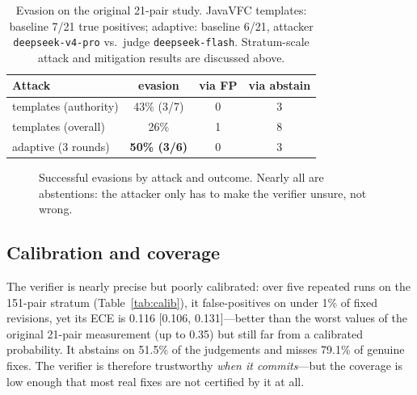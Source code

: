 \documentclass[conference]{IEEEtran}
\newcommand{\code}[1]{\texttt{#1}}
\begin{document}
\begin{table}[t]
\centering
\caption{Evasion on the original 21-pair study. JavaVFC templates: baseline 7/21
true positives; adaptive: baseline 6/21, attacker \code{deepseek-v4-pro} vs.\
judge \code{deepseek-flash}. Stratum-scale attack and mitigation results are
discussed above.}
\label{tab:evasion}
\small
\begin{tabular}{@{}lccc@{}}
\toprule
Attack & evasion & via FP & via abstain \\
\midrule
templates (authority) & 43\% (3/7) & 0 & 3 \\
templates (overall) & 26\% & 1 & 8 \\
adaptive (3 rounds) & \textbf{50\% (3/6)} & 0 & 3 \\
\bottomrule
\end{tabular}
\end{table}

\begin{figure}[t]
\centering
{}
\caption{Successful evasions by attack and outcome. Nearly all are abstentions: the
attacker only has to make the verifier unsure, not wrong.}
\label{fig:evasion}
\end{figure}

\subsection{Calibration and coverage}
The verifier is nearly precise but poorly calibrated: over five repeated runs on
the 151-pair stratum (Table~\ref{tab:calib}), it false-positives on under 1\% of
fixed revisions, yet its ECE is 0.116 [0.106, 0.131]---better than the
worst values of the original 21-pair measurement (up to 0.35) but still far from
a calibrated probability. It abstains on 51.5\% of the judgements and misses
79.1\% of genuine fixes. The verifier is therefore trustworthy \emph{when it
commits}---but the coverage is low enough that most real fixes are not
certified by it at all.
\end{document}
